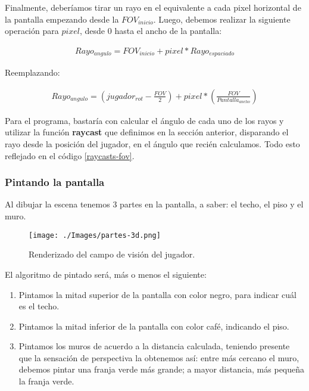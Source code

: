 Finalmente, deberíamos tirar un rayo en el equivalente a cada pixel horizontal de la pantalla empezando desde la $FOV_{inicio}$. Luego, debemos realizar la siguiente operación para $pixel$, desde 0 hasta el ancho de la pantalla:

\begin{equation}
\begin{aligned}
\label{eq-rayo}
Rayo_{angulo} = FOV_{inicio} + pixel * Rayo_{espaciado} 
\end{aligned}
\end{equation}

Reemplazando:

\begin{equation}
\begin{aligned}
\label{eq-rayo-2}
Rayo_{angulo} = \left(jugador_{rot} - \frac{FOV}{2} \right) + pixel * \left(\frac{FOV}{Pantalla_{ancho}}\right)
\end{aligned}
\end{equation}

Para el programa, bastaría con calcular el ángulo de cada uno de los rayos y utilizar la función \textbf{raycast} que definimos en la sección anterior, disparando el rayo desde la posición del jugador, en el ángulo que recién calculamos. Todo esto reflejado en el código \ref{raycasts-fov}.



\subsubsection{Pintando la pantalla}


Al dibujar la escena tenemos 3 partes en la pantalla, a saber: el techo, el piso y el muro.

\begin{figure}[h!]
	\centering
	\texttt{[image: ./Images/partes-3d.png]}
	\caption{Renderizado del campo de visión del jugador.}
	\label{partes-3d}
\end{figure}

El algoritmo de pintado será, más o menos el siguiente: 

\begin{enumerate}
\item Pintamos la mitad superior de la pantalla con color negro, para indicar cuál es el techo.
\item Pintamos la mitad inferior de la pantalla con color café, indicando el piso.
\item Pintamos los muros de acuerdo a la distancia calculada, teniendo presente que la sensación de perspectiva la obtenemos así: entre más cercano el muro, debemos pintar una franja verde más grande; a mayor distancia, más pequeña la franja verde.
\end{enumerate}

